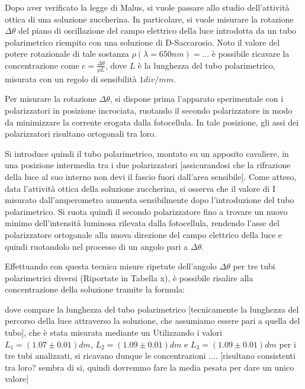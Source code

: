 \documentclass{article}
\begin{document}
	Dopo aver verificato la legge di Malus, si vuole passare allo studio dell'attività ottica di una soluzione zuccherina.
	In particolare, si vuole misurare la rotazione $\Delta \theta$ del piano di oscillazione del campo elettrico della luce introdotta da un tubo polarimetrico riempito con una soluzione di D-Saccarosio. Noto il valore del potere rotazionale di tale sostanza $\rho(\lambda=650nm)=...$ è possibile ricavare la concentrazione come $c = \frac{\Delta \theta}{\rho L}$, dove $L$ è la lunghezza del tubo polarimetrico, misurata con un regolo di sensibilità $1 div/mm$.
	
	Per misurare la rotazione $\Delta \theta$, si dispone prima l'apparato sperimentale con i polarizzatori in posizione incrociata, ruotando il secondo polarizzatore in modo da minimizzare la corrente erogata dalla fotocellula. In tale posizione, gli assi dei polarizzatori risultano ortogonali tra loro.
	
	Si introduce quindi il tubo polarimetrico, montato su un apposito cavaliere, in una posizione intermedia tra i due polarizzatori [assicurandosi che la rifrazione della luce al suo interno non devi il fascio fuori dall'area sensibile].
	Come atteso, data l'attività ottica della soluzione zuccherina, si osserva che il valore di I misurato dall'amperometro aumenta sensibilmente dopo l'introduzione del tubo polarimetrico.
	Si ruota quindi il secondo polarizzatore fino a trovare un nuovo minimo dell'intensità luminosa rilevata dalla fotocellula, rendendo l'asse del polarizzatore ortogonale alla nuova direzione del campo elettrico della luce e quindi ruotandolo nel processo di un angolo pari a $\Delta \theta$. 
	
	Effettuando con questa tecnica misure ripetute dell'angolo $\Delta \theta$ per tre tubi polarimetrici diversi (Riportate in Tabella x), è possibile risalire alla concentrazione della soluzione tramite la formula:
	
	
	dove compare la lunghezza del tubo polarimetrico [tecnicamente la lunghezza del percorso della luce attraverso la soluzione, che assumiamo essere pari a quella del tubo], che è stata misurata mediante un 
	Utilizzando i valori $L_1 = (1.07 \pm 0.01) dm$, $L_2 = (1.09 \pm 0.01) dm$ e $L_3 = (1.09 \pm 0.01) dm$ per i tre tubi analizzati, si ricavano dunque le concentrazioni ....
	[risultano consistenti tra loro? sembra di si, quindi dovremmo fare la media pesata per dare un unico valore]
	

	
\end{document}
